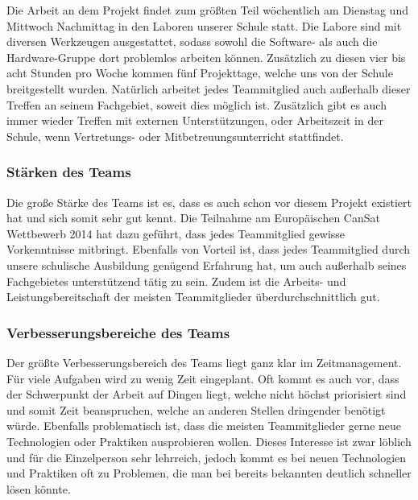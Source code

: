 Die Arbeit an dem Projekt findet zum größten Teil wöchentlich am Dienstag und Mittwoch Nachmittag in den Laboren unserer Schule statt. Die Labore sind mit diversen Werkzeugen ausgestattet, sodass sowohl die Software- als auch die Hardware-Gruppe dort problemlos arbeiten können. Zusätzlich zu diesen vier bis acht Stunden pro Woche kommen fünf Projekttage, welche uns von der Schule breitgestellt wurden. Natürlich arbeitet jedes Teammitglied auch außerhalb dieser Treffen an seinem Fachgebiet, soweit dies möglich ist. Zusätzlich gibt es auch immer wieder Treffen mit externen Unterstützungen, oder Arbeitszeit in der Schule, wenn Vertretungs- oder Mitbetreuungsunterricht stattfindet.

\subsubsection{Stärken des Teams}
Die große Stärke des Teams ist es, dass es auch schon vor diesem Projekt existiert hat und sich somit sehr gut kennt. Die Teilnahme am Europäischen CanSat Wettbewerb 2014 hat dazu geführt, dass jedes Teammitglied gewisse Vorkenntnisse mitbringt. Ebenfalls von Vorteil ist, dass jedes Teammitglied durch unsere schulische Ausbildung genügend Erfahrung hat, um auch außerhalb seines Fachgebietes unterstützend tätig zu sein. Zudem ist die Arbeits- und Leistungsbereitschaft der meisten Teammitglieder überdurchschnittlich gut.

\subsubsection{Verbesserungsbereiche des Teams}
Der größte Verbesserungsbereich des Teams liegt ganz klar im Zeitmanagement. Für viele Aufgaben wird zu wenig Zeit eingeplant. Oft kommt es auch vor, dass der Schwerpunkt der Arbeit auf Dingen liegt, welche nicht höchst priorisiert sind und somit Zeit beanspruchen, welche an anderen Stellen dringender benötigt würde. Ebenfalls problematisch ist, dass die meisten Teammitglieder gerne neue Technologien oder Praktiken ausprobieren wollen. Dieses Interesse ist zwar löblich und für die Einzelperson sehr lehrreich, jedoch kommt es bei neuen Technologien und Praktiken oft zu Problemen, die man bei bereits bekannten deutlich schneller lösen könnte.

